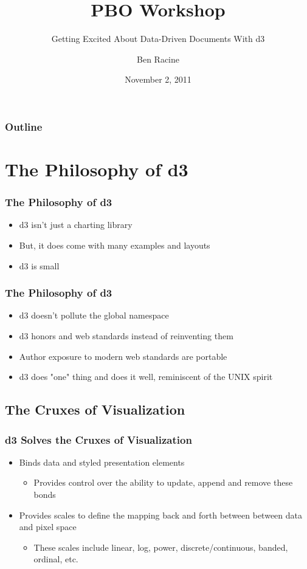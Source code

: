 \documentclass{beamer}
\title{PBO Workshop}
\subtitle{Getting Excited About Data-Driven Documents With d3}
\author{Ben Racine \inst{1} }
\institute{\inst{1} Cornerstone Systems NW }
\date{November 2, 2011}
\begin{document}
\begin{frame}
    \frametitle{}
    \titlepage
\end{frame}


 \begin{frame}
    \scriptsize{
        \frametitle{Outline}
        \tableofcontents[pausesections]
    }
 \end{frame}



\section{The Philosophy of d3}


\begin{frame}
\frametitle{The Philosophy of d3}
\begin{itemize}
\item d3 isn't just a charting library
\pause
\item But, it does come with many examples and layouts
\pause
\item d3 is small
\end{itemize}
\end{frame}



\begin{frame}
\frametitle{The Philosophy of d3}
\begin{itemize}
\item d3 doesn't pollute the global namespace
\pause
\item d3 honors and web standards instead of reinventing them
\pause
\item Author exposure to modern web standards are portable
\pause
\item d3 does "one" thing and does it well, reminiscent of the UNIX spirit
\end{itemize}
\end{frame}


\subsection{The Cruxes of Visualization}


\begin{frame}
\frametitle{d3 Solves the Cruxes of Visualization}
\begin{itemize}
\item Binds data and styled presentation elements 
    \begin{itemize}
    \item Provides control over the ability to update, append and remove these bonds
    \end{itemize}
\pause
\item Provides scales to define the mapping back and forth between between data and pixel space
    \begin{itemize}
    \item These scales include linear, log, power, discrete/continuous, banded, ordinal, etc.
    \end{itemize}
\end{itemize}
\end{frame}
\end{document}
